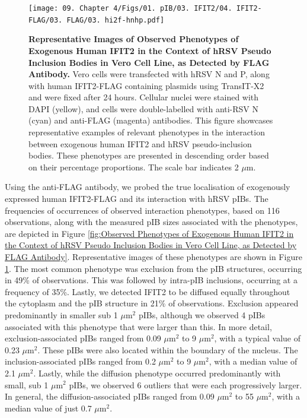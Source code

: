 \begin{figure}
    \centering
    \texttt{[image: 09. Chapter 4/Figs/01. pIB/03. IFIT2/04. IFIT2-FLAG/03. FLAG/03. hi2f-hnhp.pdf]}
    \caption[Representative Images of Observed Phenotypes of Exogenous Human IFIT2 in the Context of hRSV Pseudo Inclusion Bodies in Vero Cell Line, as Detected by FLAG Antibody.]{\textbf{Representative Images of Observed Phenotypes of Exogenous Human IFIT2 in the Context of hRSV Pseudo Inclusion Bodies in Vero Cell Line, as Detected by FLAG Antibody.} Vero cells were transfected with hRSV N and P, along with human IFIT2-FLAG containing plasmids using TransIT-X2 and were fixed after 24 hours. Cellular nuclei were stained with DAPI (yellow), and cells were double-labelled with anti-RSV N (cyan) and anti-FLAG (magenta) antibodies. This figure showcases representative examples of relevant phenotypes in the interaction between exogenous human IFIT2 and hRSV pseudo-inclusion bodies. These phenotypes are presented in descending order based on their percentage proportions. The scale bar indicates 2 \(\mu \mbox{m}\).}
    \label{fig:Representative Images of Observed Phenotypes of Exogenous Human IFIT2 in the Context of hRSV Pseudo Inclusion Bodies in Vero Cell Line, as Detected by FLAG Antibody}
\end{figure}

Using the anti-FLAG antibody, we probed the true localisation of exogenously expressed human IFIT2-FLAG and its interaction with hRSV pIBs. The frequencies of occurrences of observed interaction phenotypes, based on 116 observations, along with the measured pIB sizes associated with the phenotypes, are depicted in Figure \ref{fig:Observed Phenotypes of Exogenous Human IFIT2 in the Context of hRSV Pseudo Inclusion Bodies in Vero Cell Line, as Detected by FLAG Antibody}. Representative images of these phenotypes are shown in Figure \ref{fig:Representative Images of Observed Phenotypes of Exogenous Human IFIT2 in the Context of hRSV Pseudo Inclusion Bodies in Vero Cell Line, as Detected by FLAG Antibody}. The most common phenotype was exclusion from the pIB structures, occurring in 49\% of observations. This was followed by intra-pIB inclusions, occurring at a frequency of 35\%. Lastly, we detected IFIT2 to be diffused equally throughout the cytoplasm and the pIB structure in 21\% of observations. Exclusion appeared predominantly in smaller sub 1 \(\mu \mbox{m}^2\) pIBs, although we observed 4 pIBs associated with this phenotype that were larger than this. In more detail, exclusion-associated pIBs ranged from 0.09 \(\mu \mbox{m}^2\) to 9 \(\mu \mbox{m}^2\), with a typical value of 0.23 \(\mu \mbox{m}^2\). These pIBs were also located within the boundary of the nucleus. The inclusion-associated pIBs ranged from 0.2 \(\mu \mbox{m}^2\) to 9 \(\mu \mbox{m}^2\), with a median value of 2.1 \(\mu \mbox{m}^2\). Lastly, while the diffusion phenotype occurred predominantly with small, sub 1 \(\mu \mbox{m}^2\) pIBs, we observed 6 outliers that were each progressively larger. In general, the diffusion-associated pIBs ranged from 0.09 \(\mu \mbox{m}^2\) to 55 \(\mu \mbox{m}^2\), with a median value of just 0.7 \(\mu \mbox{m}^2\).


